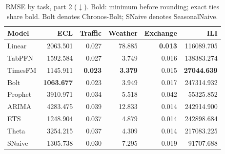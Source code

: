 \begin{table}[!htbp]
\centering
\caption{RMSE by task, part 2 ($\downarrow$). Bold: minimum before rounding; exact ties share bold. Bolt denotes Chronos-Bolt; SNaive denotes SeasonalNaive.}
\label{tab:rmse2}
\small
\setlength{\tabcolsep}{3.5pt}
\begin{tabular}{lrrrrr}
\hline
Model & ECL & Traffic & Weather & Exchange & ILI \\
\hline
Linear & 2063.501 & 0.027 & 78.885 & \textbf{0.013} & 116089.705 \\
TabPFN & 1592.584 & 0.027 & 3.749 & 0.016 & 138383.274 \\
TimesFM & 1145.911 & \textbf{0.023} & \textbf{3.379} & 0.015 & \textbf{27044.639} \\
Bolt & \textbf{1063.677} & 0.023 & 3.949 & 0.017 & 247314.932 \\
Prophet & 3910.971 & 0.034 & 5.518 & 0.042 & 55325.852 \\
ARIMA & 4283.475 & 0.039 & 12.833 & 0.014 & 242914.900 \\
ETS & 1248.904 & 0.037 & 4.879 & 0.014 & 242898.684 \\
Theta & 3254.215 & 0.037 & 4.309 & 0.014 & 217083.225 \\
SNaive & 1305.738 & 0.030 & 7.295 & 0.019 & 91707.688 \\
\hline
\end{tabular}
\end{table}
